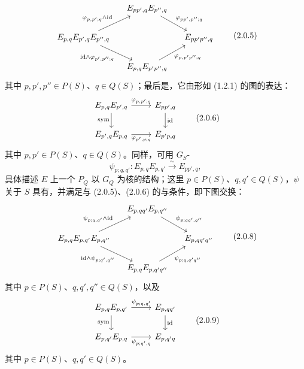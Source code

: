 \[
\begin{tikzcd}[column sep=small]
&E_{pp',q}E_{p'',q}\arrow[dr,"{\varphi_{pp',p'';q}}"]&\\
E_{p,q}E_{p',q}E_{p'',q}\arrow[ur,"{\varphi_{p,p';q}\wedge\mathrm{id}}"]\arrow[dr,"{\mathrm{id}\wedge\varphi_{p',p'';q}}"']&&E_{pp'p'',q}\\
&E_{p,q}E_{p'p'',q}\arrow[ur,"{\varphi_{p,p'p'';q}}"']&
\end{tikzcd}
\tag{2.0.5}
\]
其中 $p,p',p''\in P(S)$、$q\in Q(S)$；最后是，它由形如 (1.2.1) 的图的表达：
\[
\begin{tikzcd}
E_{p,q}E_{p',q}\arrow[r,"{\varphi_{p,p';q}}"]\arrow[d,"\mathrm{sym}"']&E_{pp',q}\arrow[d,"\mathrm{id}"]\\
E_{p',q}E_{p,q}\arrow[r,"{\varphi_{p',p;q}}"']&E_{p'p,q}
\end{tikzcd}
\tag{2.0.6}
\]
其中 $p,p'\in P(S)$、$q\in Q(S)$。同样，可用 $G_S$-
\[
\psi_{p;q,q'}:E_{p,q}E_{p,q'}\xrightarrow{\sim}E_{pp',q},\tag{2.0.7}
\]
具体描述 $E$ 上一个 $P_Q$ 以 $G_Q$ 为核的结构；这里 $p\in P(S)$、$q,q'\in Q(S)$，$\psi$ 关于 $S$ 具有，并满足与 (2.0.5)、(2.0.6) 的与条件，即下图交换：
\[
\begin{tikzcd}[column sep=small]
&E_{p,qq'}E_{p,q''}\arrow[dr,"{\psi_{p;qq',q''}}"]&\\
E_{p,q}E_{p,q'}E_{p,q''}\arrow[ur,"{\psi_{p;q,q'}\wedge\mathrm{id}}"]\arrow[dr,"{\mathrm{id}\wedge\psi_{p;q',q''}}"']&&E_{p,qq'q''}\\
&E_{p,q}E_{p,q'q''}\arrow[ur,"{\psi_{p;q,q'q''}}"']&
\end{tikzcd}
\tag{2.0.8}
\]
其中 $p\in P(S)$、$q,q',q''\in Q(S)$，以及
\[
\begin{tikzcd}
E_{p,q}E_{p,q'}\arrow[r,"{\psi_{p;q,q'}}"]\arrow[d,"\mathrm{sym}"']&E_{p,qq'}\arrow[d,"\mathrm{id}"]\\
E_{p,q'}E_{p,q}\arrow[r,"{\psi_{p;q',q}}"']&E_{p,q'q}
\end{tikzcd}
\tag{2.0.9}
\]
其中 $p\in P(S)$、$q,q'\in Q(S)$。

